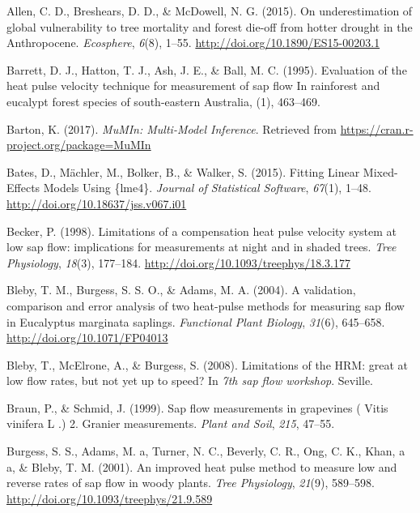 \documentclass[11pt,twoside]{reedthesis}
\begin{document}
\hypertarget{refs}{}
\hypertarget{ref-Allen2015}{}
Allen, C. D., Breshears, D. D., \& McDowell, N. G. (2015). On
underestimation of global vulnerability to tree mortality and forest
die-off from hotter drought in the Anthropocene. \emph{Ecosphere},
\emph{6}(8), 1--55. \url{http://doi.org/10.1890/ES15-00203.1}

\hypertarget{ref-Barrett1995}{}
Barrett, D. J., Hatton, T. J., Ash, J. E., \& Ball, M. C. (1995).
Evaluation of the heat pulse velocity technique for measurement of sap
flow In rainforest and eucalypt forest species of south-eastern
Australia, (1), 463--469.

\hypertarget{ref-Barton2017}{}
Barton, K. (2017). \emph{MuMIn: Multi-Model Inference}. Retrieved from
\url{https://cran.r-project.org/package=MuMIn}

\hypertarget{ref-Bates2015}{}
Bates, D., Mächler, M., Bolker, B., \& Walker, S. (2015). Fitting Linear
Mixed-Effects Models Using \{lme4\}. \emph{Journal of Statistical
Software}, \emph{67}(1), 1--48.
\url{http://doi.org/10.18637/jss.v067.i01}

\hypertarget{ref-Becker1998}{}
Becker, P. (1998). Limitations of a compensation heat pulse velocity
system at low sap flow: implications for measurements at night and in
shaded trees. \emph{Tree Physiology}, \emph{18}(3), 177--184.
\url{http://doi.org/10.1093/treephys/18.3.177}

\hypertarget{ref-Bleby2004}{}
Bleby, T. M., Burgess, S. S. O., \& Adams, M. A. (2004). A validation,
comparison and error analysis of two heat-pulse methods for measuring
sap flow in Eucalyptus marginata saplings. \emph{Functional Plant
Biology}, \emph{31}(6), 645--658. \url{http://doi.org/10.1071/FP04013}

\hypertarget{ref-Bleby2008}{}
Bleby, T., McElrone, A., \& Burgess, S. (2008). Limitations of the HRM:
great at low flow rates, but not yet up to speed? In \emph{7th sap flow
workshop}. Seville.

\hypertarget{ref-Braun1999}{}
Braun, P., \& Schmid, J. (1999). Sap flow measurements in grapevines (
Vitis vinifera L .) 2. Granier measurements. \emph{Plant and Soil},
\emph{215}, 47--55.

\hypertarget{ref-Burgess2001}{}
Burgess, S. S., Adams, M. a, Turner, N. C., Beverly, C. R., Ong, C. K.,
Khan, a a, \& Bleby, T. M. (2001). An improved heat pulse method to
measure low and reverse rates of sap flow in woody plants. \emph{Tree
Physiology}, \emph{21}(9), 589--598.
\url{http://doi.org/10.1093/treephys/21.9.589}
\end{document}
